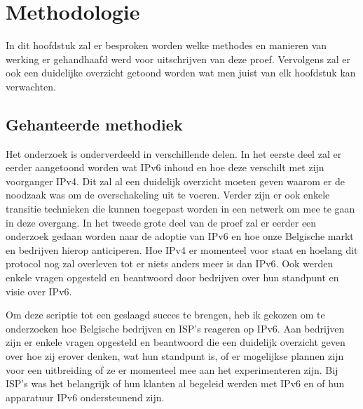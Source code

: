 
\chapter{Methodologie}
\label{ch:methodologie}



In dit hoofdstuk zal er besproken worden welke methodes en manieren van werking er gehandhaafd werd voor uitschrijven van deze proef. Vervolgens zal er ook een duidelijke overzicht getoond worden wat men juist van elk hoofdstuk kan verwachten.

\section{Gehanteerde methodiek}

Het onderzoek is onderverdeeld in verschillende delen. In het eerste deel zal er eerder aangetoond worden wat IPv6 inhoud en hoe deze verschilt met zijn voorganger IPv4. Dit zal al een duidelijk overzicht moeten geven waarom er de noodzaak was om de overschakeling uit te voeren. Verder zijn er ook enkele transitie technieken die kunnen toegepast worden in een netwerk om mee te gaan in deze overgang. In het tweede grote deel van de proef zal er eerder een onderzoek gedaan worden naar de adoptie van IPv6 en hoe onze Belgische markt en bedrijven hierop anticiperen. Hoe IPv4 er momenteel voor staat en hoelang dit protocol nog zal overleven tot er niets anders meer is dan IPv6. Ook werden enkele vragen opgesteld en beantwoord door bedrijven over hun standpunt en visie over IPv6. 

Om deze scriptie tot een geslaagd succes te brengen, heb ik gekozen om te onderzoeken hoe Belgische bedrijven en ISP’s reageren op IPv6. Aan bedrijven zijn er enkele vragen opgesteld en beantwoord die een duidelijk overzicht geven over hoe zij erover denken, wat hun standpunt is, of er mogelijkse plannen zijn voor een uitbreiding of ze er momenteel mee aan het experimenteren zijn. Bij ISP’s was het belangrijk of hun klanten al begeleid werden met IPv6 en of hun apparatuur IPv6 ondersteunend zijn.

